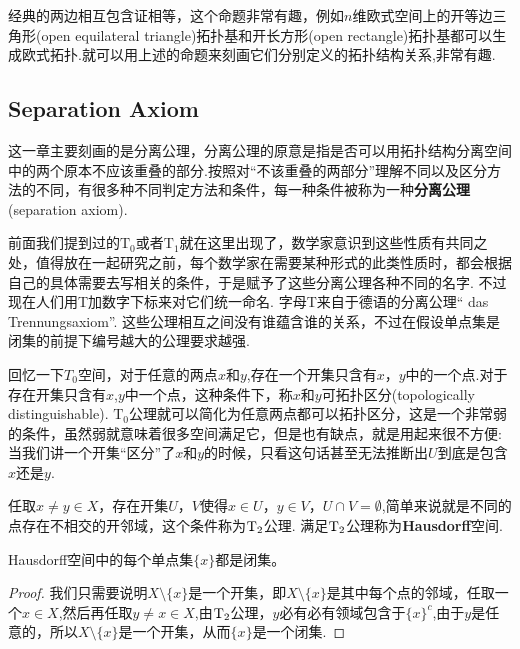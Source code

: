 经典的两边相互包含证相等，这个命题非常有趣，例如$n$维欧式空间上的开等边三角形(open equilateral triangle)拓扑基和开长方形(open  rectangle)拓扑基都可以生成欧式拓扑.就可以用上述的命题来刻画它们分别定义的拓扑结构关系,非常有趣.

\newpage

\subsection{Separation Axiom}

这一章主要刻画的是分离公理，分离公理的原意是指是否可以用拓扑结构分离空间中的两个原本不应该重叠的部分.按照对“不该重叠的两部分”理解不同以及区分方法的不同，有很多种不同判定方法和条件，每一种条件被称为一种\textbf{分离公理}(separation axiom).

前面我们提到过的$\text{T}_0$或者$\text{T}_1$就在这里出现了，数学家意识到这些性质有共同之处，值得放在一起研究之前，每个数学家在需要某种形式的此类性质时，都会根据自己的具体需要去写相关的条件，于是赋予了这些分离公理各种不同的名字. 不过现在人们用T加数字下标来对它们统一命名. 字母T来自于德语的分离公理“	das Trennungsaxiom”. 这些公理相互之间没有谁蕴含谁的关系，不过在假设单点集是闭集的前提下编号越大的公理要求越强. 

回忆一下$T_0$空间，对于任意的两点$x$和$y$,存在一个开集只含有$x$，$y$中的一个点.对于存在开集只含有$x$,$y$中一个点，这种条件下，称$x$和$y$可拓扑区分(topologically distinguishable). $\text{T}_0$公理就可以简化为任意两点都可以拓扑区分，这是一个非常弱的条件，虽然弱就意味着很多空间满足它，但是也有缺点，就是用起来很不方便: 当我们讲一个开集“区分”了$x$和$y$的时候，只看这句话甚至无法推断出$U$到底是包含$x$还是$y$.

\begin{definition}
任取$x \neq y \in X$，存在开集$U$，$V$使得$x \in U$，$y \in V$，$U \cap V = \emptyset$,简单来说就是不同的点存在不相交的开邻域，这个条件称为$\rm T_2$公理. 满足$\rm T_2$公理称为\rm\textbf{Hausdorff}空间.
\end{definition}

\begin{proposition}
\rm Hausdorff空间中的每个单点集$\{x\}$都是闭集。
\end{proposition}

\begin{proof}
我们只需要说明$X \setminus \{x\}$是一个开集，即$X \setminus \{x\}$是其中每个点的邻域，任取一个$x \in X$,然后再任取$y \neq x \in X$,由$\rm T_2$公理，$y$必有必有领域包含于$\{x\}^c$,由于$y$是任意的，所以$X \setminus \{x\}$是一个开集，从而$\{x\}$是一个闭集.
\end{proof}

